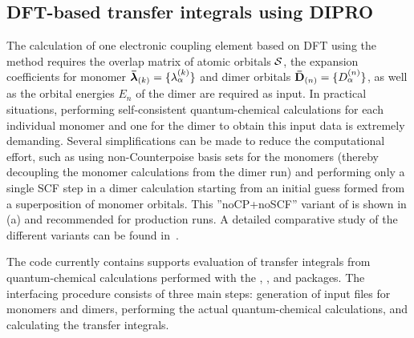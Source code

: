 \subsection{DFT-based transfer integrals using DIPRO}
\label{sec:dft}

The calculation of one electronic coupling element based on DFT using the \dipro method requires the overlap matrix of atomic orbitals $\mathbf{ \mathcal{S} }$, the expansion coefficients for monomer $\mathbf{ \bar{\boldsymbol{\lambda}} }_{(k)} = \{ \lambda_\alpha^{(k)}\}$ and dimer orbitals $\mathbf{ \bar{D} }_{(n)} = \{ D^{(n)}_{\alpha} \}$, as well as the orbital energies $E_{n}$ of the dimer are required as input. In practical situations, performing self-consistent quantum-chemical calculations for each individual monomer and one for the dimer to obtain this input data is extremely demanding. Several simplifications can be made to reduce the computational effort, such as using non-Counterpoise basis sets for the monomers (thereby decoupling the monomer calculations from the dimer run) and performing only a single SCF step in a dimer calculation starting from an initial guess formed from a superposition of monomer orbitals. This ''noCP+noSCF'' variant of \dipro is shown in (a) and recommended for production runs. 
A detailed comparative study of the different variants can be found in~\cite{baumeier_density-functional_2010}.

The code currently contains supports evaluation of transfer integrals from quantum-chemical calculations performed with the \gaussian, \turbomole, and \nwchem packages. The interfacing procedure consists of three main steps: generation of input files for monomers and dimers, performing the actual quantum-chemical calculations, and calculating the transfer integrals. 

